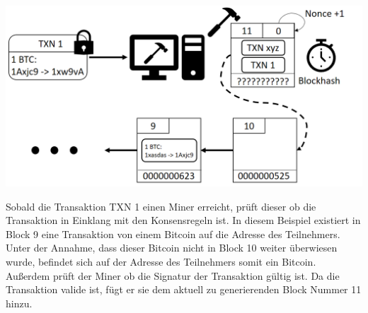 \vspace{1cm}
\begin{minipage}{0.55\textwidth}
\includegraphics[width=\textwidth]{Figures/konzept_btc/konzept4}
\centering
\decoRule
{}
\label{fig:konzept4}
\end{minipage}
\begin{minipage}{0.45\textwidth}
Sobald die Transaktion TXN 1 einen Miner erreicht, prüft dieser ob die Transaktion in Einklang mit den Konsensregeln ist. In diesem Beispiel existiert in Block 9 eine Transaktion von einem Bitcoin auf die Adresse des Teilnehmers. Unter der Annahme, dass dieser Bitcoin nicht in Block 10 weiter überwiesen wurde, befindet sich auf der Adresse des Teilnehmers somit ein Bitcoin. Außerdem prüft der Miner ob die Signatur der Transaktion gültig ist. Da die Transaktion valide ist, fügt er sie dem aktuell zu generierenden Block Nummer 11 hinzu. 
\end{minipage}


